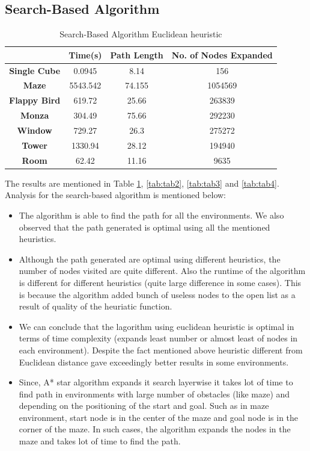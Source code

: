 \documentclass[conference]{IEEEtran}
\begin{document}
\subsection{Search-Based Algorithm}
\begin{table}[h]
    \centering
    \caption{Search-Based Algorithm Euclidean heuristic}
    \label{tab:tab1}
    \begin{tabular}{|c|c|c|c|}
    \hline
    & \textbf{Time(s)} & \textbf{Path Length} & \textbf{No. of Nodes Expanded} \\ \hline
    \textbf{Single Cube} & 0.0945 & 8.14 & 156 \\ \hline
    \textbf{Maze} & 5543.542 & 74.155 & 1054569 \\ \hline
    \textbf{Flappy Bird} & 619.72 & 25.66 & 263839 \\ \hline
    \textbf{Monza} & 304.49 & 75.66 & 292230 \\ \hline
    \textbf{Window} & 729.27 & 26.3 & 275272 \\ \hline
    \textbf{Tower} & 1330.94 & 28.12 & 194940 \\ \hline
    \textbf{Room} & 62.42 & 11.16 & 9635 \\ \hline
    \end{tabular}
    \end{table}
The results are mentioned in Table \ref{tab:tab1}, \ref{tab:tab2}, \ref{tab:tab3} and \ref{tab:tab4}. Analysis for the search-based algorithm is mentioned below:
\begin{itemize}
    \item The algorithm is able to find the path for all the environments. We also observed that the path generated is optimal using all the mentioned heuristics. 
    \item Although the path generated are optimal using different heuristics, the number of nodes visited are quite different. Also the runtime of the algorithm is different for different heuristics (quite large difference in some cases). This is because the algorithm 
    added bunch of useless nodes to the open list as a result of quality of the heuriatic function.
    \item We can conclude that the lagorithm using euclidean heuristic is optimal in terms of time complexity (expands least number or almost least of nodes in each environment).
    Despite the fact mentioned above heuristic different from Euclidean distance gave exceedingly better results in some environments.
    \item Since, A* star algorithm expands it search layerwise it takes lot of time to find path in environments with large number of obstacles (like maze) and depending on the positioning of the start and goal. Such as in maze environment, start node is in the center of the 
    maze and goal node is in the corner of the maze. In such cases, the algorithm expands the nodes in the maze and takes lot of time to find the path.
\end{itemize}
\end{document}
